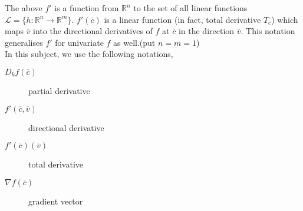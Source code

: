 \begin{note}
	The above $f'$ is a function from $\mathbb{R}^n$ to the set of all linear functions \( \mathscr{L} = \{ h : \mathbb{R}^n \to \mathbb{R}^m\} \).
	$f'(\overline{c})$ is a linear function (in fact, total derivative $T_{\overline{c}}$) which maps $\overline{v}$ into the directional derivatives of $f$ at $\overline{c}$ in the direction $\overline{v}$.
	This notation generalises $f'$ for univariate $f$ as well.(put $n=m=1$)\\

	In this subject, we use the following notations,
	\begin{description}
		\item[$D_kf(\overline{c})$] partial derivative
		\item[$f'(\overline{c},\overline{v})$] directional derivative
		\item[$f'(\overline{c})(\overline{v})$] total derivative
		\item[$\nabla{}f(\overline{c})$] gradient vector
	\end{description}
\end{note}

